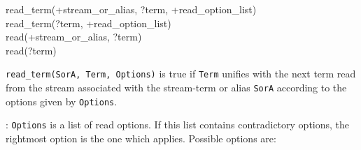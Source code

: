 \begin{TemplatesOneCol}
read\_term(+stream\_or\_alias, ?term, +read\_option\_list)\\
read\_term(?term, +read\_option\_list)\\
read(+stream\_or\_alias, ?term)\\
read(?term)

\end{TemplatesOneCol}

\Description

\texttt{read\_term(SorA, Term, Options)} is true if
\texttt{Term} unifies with the next term read from the stream associated
with the stream-term or alias \texttt{SorA} according to the options given by
\texttt{Options}.

: \texttt{Options} is a list of read options. If this
list contains contradictory options, the rightmost option is the one which
applies. Possible options are:

